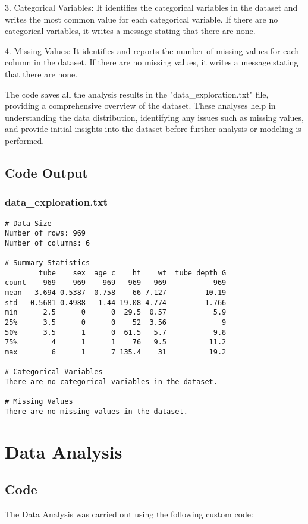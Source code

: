 \documentclass[11pt]{article}
\begin{document}
3. Categorical Variables: It identifies the categorical variables in the dataset and writes the most common value for each categorical variable. If there are no categorical variables, it writes a message stating that there are none.

4. Missing Values: It identifies and reports the number of missing values for each column in the dataset. If there are no missing values, it writes a message stating that there are none.

The code saves all the analysis results in the "data\_exploration.txt" file, providing a comprehensive overview of the dataset. These analyses help in understanding the data distribution, identifying any issues such as missing values, and provide initial insights into the dataset before further analysis or modeling is performed.

\subsection{Code Output}

\subsubsection*{data\_exploration.txt}

\begin{Verbatim}[tabsize=4]
# Data Size
Number of rows: 969
Number of columns: 6

# Summary Statistics
        tube    sex  age_c    ht    wt  tube_depth_G
count    969    969    969   969   969           969
mean   3.694 0.5387  0.758    66 7.127         10.19
std   0.5681 0.4988   1.44 19.08 4.774         1.766
min      2.5      0      0  29.5  0.57           5.9
25%      3.5      0      0    52  3.56             9
50%      3.5      1      0  61.5   5.7           9.8
75%        4      1      1    76   9.5          11.2
max        6      1      7 135.4    31          19.2

# Categorical Variables
There are no categorical variables in the dataset.

# Missing Values
There are no missing values in the dataset.

\end{Verbatim}

\section{Data Analysis}
\subsection{{Code}}
The Data Analysis was carried out using the following custom code:
\end{document}
